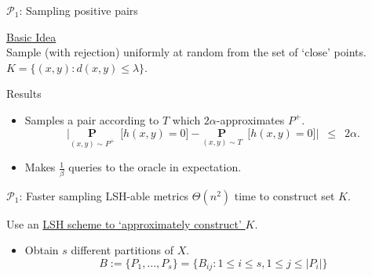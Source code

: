 \documentclass{beamer}
\newcommand{\mc}{\mathcal}
\newcommand{\mb}{\mathbf}
\begin{document}
\begin{frame}[label=detailsRCCPositive]{$\mc P_1$: Sampling positive pairs}
	
	\vspace{20pt}\textcolor{blue}{\hyperlink{RCCPositive}{Basic Idea}}\\
	Sample (with rejection) uniformly at random from the set of `close' points. $K = \{(x, y): d(x, y) \le \lambda\}$. 

	\vspace{10pt}\begin{block}{Results}
		\begin{itemize}
			\vspace{5pt}\item Samples a pair according to $T$ which $2\alpha$-approximates $P^+$.
			$$\Big|\underset{(x, y) \sim P^+}{\mb P}\enspace \big[ h(x, y) = 0 ] - \underset{(x, y) \sim T}{\mb P}\enspace \big[ h(x, y) = 0 ]\Big|  \enspace \le \enspace 2\alpha.$$ 
			\vspace{5pt}\item Makes $\frac{1}{\beta}$ queries to the oracle in expectation. 
		\end{itemize}			
	\end{block}
\end{frame}

\begin{frame}[label=detailsRCCPositiveLSH]{$\mc P_1$: Faster sampling LSH-able metrics}
		\vspace{20pt}\alert{$\Theta(n^2)$} time to construct set $K$.	

	\vspace{20pt}Use an \hyperlink{RCCPositive}{LSH scheme to `approximately construct' $K$}.
 	\begin{itemize}
		\vspace{5pt}\item Obtain $s$ different partitions of $X$.
		$$ B := \{P_1, \ldots, P_s\} = \{B_{ij} : 1\le i\le s, 1\le j \le |P_i|\}$$
	\end{itemize}	
\end{frame}
\end{document}
